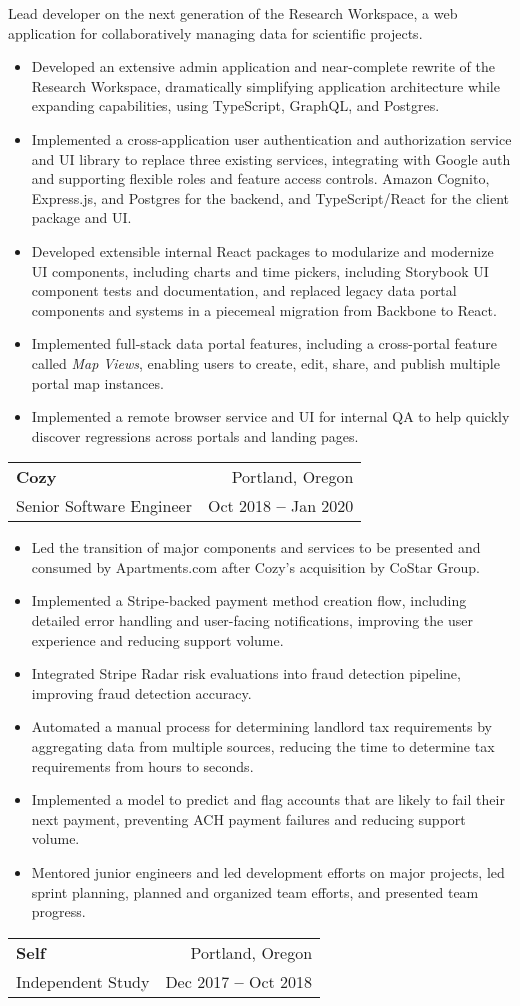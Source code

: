 \documentclass[letterpaper,11pt]{article}
\makeatletter
\newcommand{\resumeItem}[1]{
  \item\small{
    {#1 \vspace{-2pt}}
  }
}
\newcommand{\resumeSubheading}[4]{
  \item
    \begin{tabular*}{0.97\textwidth}[t]{l@{\extracolsep{\fill}}r}
      \normalsize \textbf{#1} & \small#2 \\
      \small #3 & \small #4 \\
    \end{tabular*}\vspace{-5pt}
}
\newcommand{\resumeItemListStart}{\begin{itemize}}
\newcommand{\resumeItemListEnd}{\end{itemize}\vspace{-5pt}}
\newcommand{\resumeSectionBody}[1]{
  \vspace{0.7em}
  \small #1
  \vspace{-5pt}
}
\makeatother
\begin{document}
      \resumeSectionBody{
        Lead developer on the next generation of the Research Workspace, a web application for collaboratively managing data for scientific projects.
      }
      \resumeItemListStart
        \resumeItem{Developed an extensive admin application and near-complete rewrite of the Research Workspace, dramatically simplifying application architecture while expanding capabilities, using TypeScript, GraphQL, and Postgres.}
        \resumeItem{Implemented a cross-application user authentication and authorization service and UI library to replace three existing services, integrating with Google auth and supporting flexible roles and feature access controls. Amazon Cognito, Express.js, and Postgres for the backend, and TypeScript/React for the client package and UI.}
        \resumeItem{Developed extensible internal React packages to modularize and modernize UI components, including charts and time pickers, including Storybook UI component tests and documentation, and replaced legacy data portal components and systems in a piecemeal migration from Backbone to React.}
        \resumeItem{Implemented full-stack data portal features, including a cross-portal feature called \textit{Map Views}, enabling users to create, edit, share, and publish multiple portal map instances.}
        \resumeItem{Implemented a remote browser service and UI for internal QA to help quickly discover regressions across portals and landing pages.}
      \resumeItemListEnd
    \resumeSubheading
      {Cozy}{Portland, Oregon}
      {Senior Software Engineer}{Oct 2018 \textbf{--} Jan 2020}
        \resumeItemListStart
          \resumeItem{Led the transition of major components and services to be presented and consumed by Apartments.com after Cozy's acquisition by CoStar Group.}
          \resumeItem{Implemented a Stripe-backed payment method creation flow, including detailed error handling and user-facing notifications, improving the user experience and reducing support volume.}
          \resumeItem{Integrated Stripe Radar risk evaluations into fraud detection pipeline, improving fraud detection accuracy.}
          \resumeItem{Automated a manual process for determining landlord tax requirements by aggregating data from multiple sources, reducing the time to determine tax requirements from hours to seconds.}
          \resumeItem{Implemented a model to predict and flag accounts that are likely to fail their next payment, preventing ACH payment failures and reducing support volume.}
          \resumeItem{Mentored junior engineers and led development efforts on major projects, led sprint planning, planned and organized team efforts, and presented team progress.}
        \resumeItemListEnd
    \resumeSubheading
      {Self}{Portland, Oregon}
      {Independent Study}{Dec 2017 \textbf{--} Oct 2018}
\end{document}
